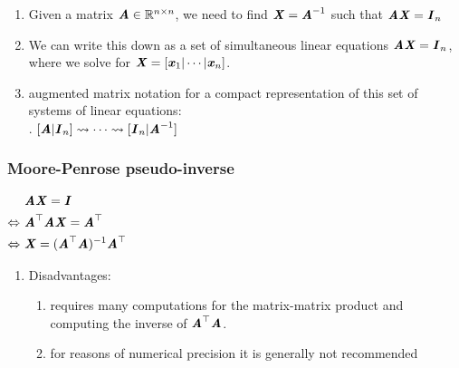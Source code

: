 \begin{enumerate}
    \item Given a matrix $\text{\textbf{\textit{A}}} \in \mathbb{R}^{n\times n}$, we need to find $\text{\textbf{\textit{X}}} = \text{\textbf{\textit{A}}}^{-1}$ such that $\text{\textbf{\textit{A}}}\text{\textbf{\textit{X}}} = \text{\textbf{\textit{I}}}_n$
    \hfill \cite{mfml/book/mml/Deisenroth-Faisal-Ong}
    
    \item We can write this down as a set of simultaneous linear equations $\text{\textbf{\textit{A}}}\text{\textbf{\textit{X}}} = \text{\textbf{\textit{I}}}_n$, where we solve for $\text{\textbf{\textit{X}}} = [\text{\textbf{\textit{x}}}_1| \cdots |\text{\textbf{\textit{x}}}_n]$. 
    \hfill \cite{mfml/book/mml/Deisenroth-Faisal-Ong}

    \item augmented matrix notation for a compact representation of this set of systems of linear equations:
    \hfill \cite{mfml/book/mml/Deisenroth-Faisal-Ong}
    \\
    .\hfill
    $
        [\text{\textbf{\textit{A}}}|\text{\textbf{\textit{I}}}_n] 
        \mathrel{\leadsto} \cdots \mathrel{\leadsto} 
        [\text{\textbf{\textit{I}}}_n|\text{\textbf{\textit{A}}}^{-1}]
    $
    \hfill \cite{mfml/book/mml/Deisenroth-Faisal-Ong}

    
\end{enumerate}




\subsubsection{Moore-Penrose pseudo-inverse}

$
    \begin{aligned}
                         & \text{\textbf{\textit{A}}}\text{\textbf{\textit{X}}} = \text{\textbf{\textit{I}}} \\
        \Leftrightarrow\ & \text{\textbf{\textit{A}}}^\top \text{\textbf{\textit{A}}}\text{\textbf{\textit{X}}} = \text{\textbf{\textit{A}}}^\top \\
        \Leftrightarrow\ & \text{\textbf{\textit{X}}} = (\text{\textbf{\textit{A}}}^\top \text{\textbf{\textit{A}}})^{-1} \text{\textbf{\textit{A}}}^\top \\
    \end{aligned}
$
\hfill \cite{mfml/book/mml/Deisenroth-Faisal-Ong}


\vspace{0.2cm}

\begin{enumerate}
    \item Disadvantages:
    \begin{enumerate}
        \item requires many computations for the matrix-matrix product and computing the inverse of $\text{\textbf{\textit{A}}}^\top \text{\textbf{\textit{A}}}$. 
        \hfill \cite{mfml/book/mml/Deisenroth-Faisal-Ong}

        \item for reasons of numerical precision it is generally not recommended
        \hfill \cite{mfml/book/mml/Deisenroth-Faisal-Ong}
    \end{enumerate}
\end{enumerate}





